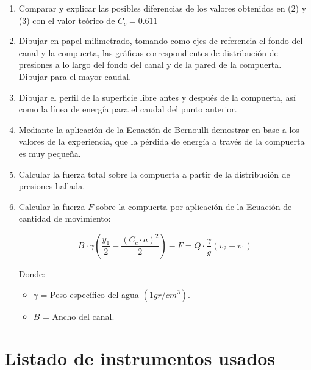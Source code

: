 \documentclass[10pt, a4paper]{exam}
\begin{document}
\begin{enumerate}
    
    \item Comparar y explicar las posibles diferencias de los valores obtenidos en (2) y (3) con el valor teórico de $C_c=0.611$

    
    \item Dibujar en papel milimetrado, tomando como ejes de referencia el fondo del canal y la compuerta, las gráficas correspondientes de distribución de presiones a lo largo del fondo del canal y de la pared de la compuerta. Dibujar para el mayor caudal. 

    
    \item Dibujar el perfil de la superficie libre antes y después de la compuerta, así como la línea de energía para el caudal del punto anterior.

    \item Mediante la aplicación de la Ecuación de Bernoulli demostrar en base a los valores de la experiencia, que la pérdida de energía a través de la compuerta es muy pequeña.

    \item Calcular la fuerza total sobre la compuerta a partir de la distribución de presiones hallada.

    \item Calcular la fuerza $F$ sobre la compuerta por aplicación de la Ecuación de cantidad de movimiento:

    $$B\cdot\gamma\left(\frac{y_1}{2} - \frac{(C_c \cdot a)^2}{2}\right) - F = Q \cdot \frac{\gamma}{g} \left(v_2-v_1 \right)$$

    Donde: 

    \begin{itemize}
        \item $\gamma$ = Peso específico del agua $(1gr/cm^3)$.
        \item $B$ = Ancho del canal.
    \end{itemize}
\end{enumerate}


\section{Listado de instrumentos usados}
\end{document}
